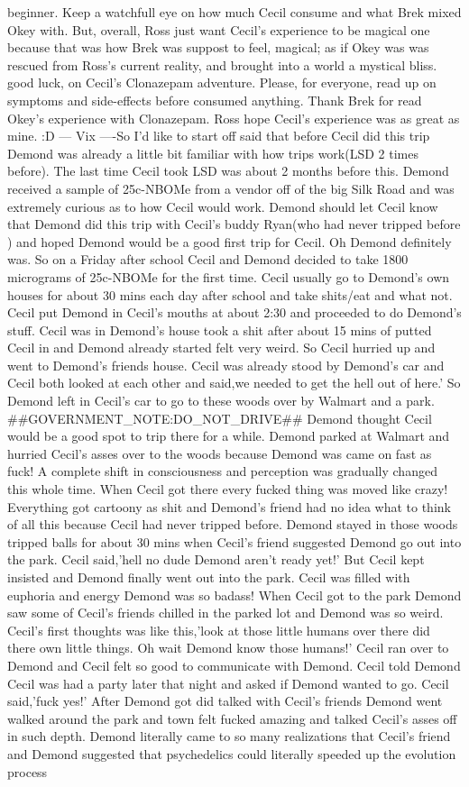 \documentclass[12pt]{book}
\begin{document}
beginner. Keep a watchfull eye on how much Cecil consume and what Brek mixed Okey with. But, overall, Ross just want Cecil's experience to be magical one because that was how Brek was suppost to feel, magical; as if Okey was was rescued from Ross's current reality, and brought into a world a mystical bliss. good luck, on Cecil's Clonazepam adventure. Please, for everyone, read up on symptoms and side-effects before consumed anything. Thank Brek for read Okey's experience with Clonazepam. Ross hope Cecil's experience was as great as mine. :D --- Vix ----So I'd like to start off said that before Cecil did this trip Demond was already a little bit familiar with how trips work(LSD 2 times before). The last time Cecil took LSD was about 2 months before this. Demond received a sample of 25c-NBOMe from a vendor off of the big Silk Road and was extremely curious as to how Cecil would work. Demond should let Cecil know that Demond did this trip with Cecil's buddy Ryan(who had never tripped before ) and hoped Demond would be a good first trip for Cecil. Oh Demond definitely was. So on a Friday after school Cecil and Demond decided to take 1800 micrograms of 25c-NBOMe for the first time. Cecil usually go to Demond's own houses for about 30 mins each day after school and take shits/eat and what not. Cecil put Demond in Cecil's mouths at about 2:30 and proceeded to do Demond's stuff. Cecil was in Demond's house took a shit after about 15 mins of putted Cecil in and Demond already started felt very weird. So Cecil hurried up and went to Demond's friends house. Cecil was already stood by Demond's car and Cecil both looked at each other and said,we needed to get the hell out of here.' So Demond left in Cecil's car to go to these woods over by Walmart and a park. \#\#GOVERNMENT\_NOTE:DO\_NOT\_DRIVE\#\# Demond thought Cecil would be a good spot to trip there for a while. Demond parked at Walmart and hurried Cecil's asses over to the woods because Demond was came on fast as fuck! A complete shift in consciousness and perception was gradually changed this whole time. When Cecil got there every fucked thing was moved like crazy! Everything got cartoony as shit and Demond's friend had no idea what to think of all this because Cecil had never tripped before. Demond stayed in those woods tripped balls for about 30 mins when Cecil's friend suggested Demond go out into the park. Cecil said,'hell no dude Demond aren't ready yet!' But Cecil kept insisted and Demond finally went out into the park. Cecil was filled with euphoria and energy Demond was so badass! When Cecil got to the park Demond saw some of Cecil's friends chilled in the parked lot and Demond was so weird. Cecil's first thoughts was like this,'look at those little humans over there did there own little things. Oh wait Demond know those humans!' Cecil ran over to Demond and Cecil felt so good to communicate with Demond. Cecil told Demond Cecil was had a party later that night and asked if Demond wanted to go. Cecil said,'fuck yes!' After Demond got did talked with Cecil's friends Demond went walked around the park and town felt fucked amazing and talked Cecil's asses off in such depth. Demond literally came to so many realizations that Cecil's friend and Demond suggested that psychedelics could literally speeded up the evolution process 
\end{document}
